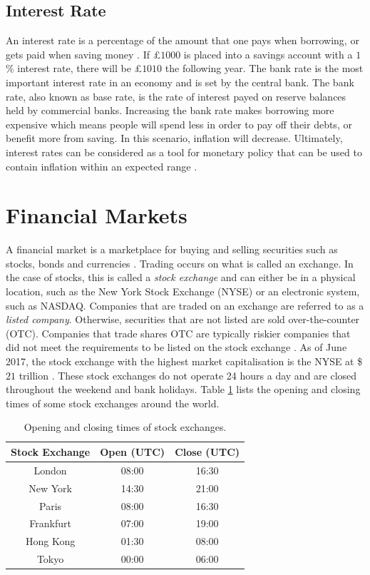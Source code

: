 \documentclass{UoYCSproject}
\begin{document}
\subsection{Interest Rate}
An interest rate is a percentage of the amount that one pays when borrowing, or gets paid when saving money \cite{interestrate}. If \pounds $1000$ is placed into a savings account with a $1$\% interest rate, there will be \pounds $1010$ the following year.  The bank rate is the most important interest rate in an economy and is set by the central bank. The bank rate, also known as base rate, is the rate of interest payed on reserve balances held by commercial banks. Increasing the bank rate makes borrowing more expensive which means people will spend less in order to pay off their debts, or benefit more from saving. In this scenario, inflation will decrease. Ultimately, interest rates can be considered as a tool for monetary policy that can be used to contain inflation within an expected range \cite{christiano1999monetary}. 

\section{Financial Markets}
\label{financialmarkets}
A financial market is a marketplace for buying and selling securities such as stocks, bonds and currencies \cite{financialmarket}. Trading occurs on what is called an exchange. In the case of stocks, this is called a \textit{stock exchange} and can either be in a physical location, such as the New York Stock Exchange (NYSE) or an electronic system, such as NASDAQ. Companies that are traded on an exchange are referred to as a \textit{listed company}. Otherwise, securities that are not listed are sold over-the-counter (OTC). Companies that trade shares OTC are typically riskier companies that did not meet the requirements to be listed on the stock exchange \cite{stockexchange}. As of June 2017, the stock exchange with the highest market capitalisation is the NYSE at \$$21$ trillion \cite{nyse}. 
These stock exchanges do not operate 24 hours a day and are closed throughout the weekend and bank holidays. Table \ref{tab:markets} lists the opening and closing times of some stock exchanges around the world. 

\begin{table}[h]
    \centering
    \begin{tabular}{|c|c|c|} \hline
        \textbf{Stock Exchange} & \textbf{Open (UTC)} & \textbf{Close (UTC)} \\ \hline
        London & 08:00 & 16:30 \\
        New York & 14:30 & 21:00 \\
        Paris & 08:00 & 16:30 \\
        Frankfurt & 07:00 & 19:00 \\
        Hong Kong & 01:30 & 08:00 \\
        Tokyo & 00:00 & 06:00 \\
        \hline
    \end{tabular}
    \caption{Opening and closing times of stock exchanges.}
    \label{tab:markets}
\end{table}
\end{document}
